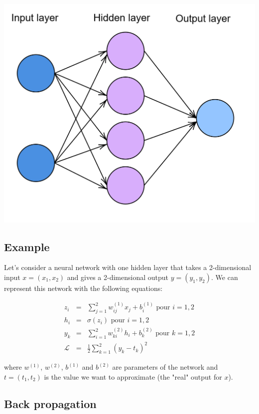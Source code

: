 \documentclass[10pt,a4paper]{article}
\theoremstyle{definition}
\theoremstyle{definition}
\begin{document}
\begin{center}
\includegraphics[scale=0.2]{nn.png}
\end{center}  

\subsection{Example} \label{2.1}

Let's consider a neural network with one hidden layer that takes a 2-dimensional input $x = (x_1, x_2)$ and gives a 2-dimensional output $y = (y_1,y_2)$. We can represent this network with the following equations:

   \begin{eqnarray}
   \nonumber
   z_i & = & \sum_{j=1}^2 w_{ij}^{(1)}x_j + b_i^{(1)} \text{ pour } i = 1,2 \\ 
   \nonumber
   h_i & = & \sigma (z_i) \text{ pour } i=1,2 \\
   \nonumber
   y_k & = & \sum_{i=1}^2 w_{ki}^{(2)}h_i + b_k^{(2)} \text{ pour } k = 1,2 \\
   \nonumber
   \mathcal{L} & = & \frac{1}{2} \sum_{k = 1}^2 (y_k - t_k)^2
   \end{eqnarray}
   
where $w^{(1)}$, $w^{(2)}$, $b^{(1)}$ and $b^{(2)}$ are parameters of the network and $t = (t_1, t_2)$ is the value we want to approximate (the "real" output for $x$). 

\subsection{Back propagation}
\end{document}
